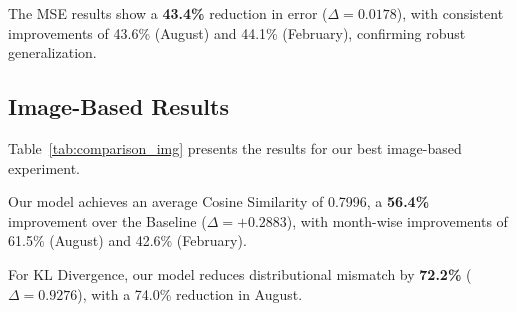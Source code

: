 The MSE results show a \textbf{43.4\%} reduction in error ($\Delta = 0.0178$), with consistent improvements of 43.6\% (August) and 44.1\% (February), confirming robust generalization.


\subsection{Image-Based Results}
\label{sec:image-results}

Table~\ref{tab:comparison_img} presents the results for our best image-based experiment.
\newline

\begin{table}[ht]
    \centering
    \caption{Performance comparison between Baseline and Our Model for image-based experiments. The Baseline model is CLIP ViT-L/14, applied without fine-tuning. Higher values are better for $\uparrow$, and lower values are better for $\downarrow$. Bold values indicate averaged scores.}
    \label{tab:comparison_img}
\end{table}

Our model achieves an average Cosine Similarity of 0.7996, a \textbf{56.4\%} improvement over the Baseline ($\Delta = +0.2883$), with month-wise improvements of 61.5\% (August) and 42.6\% (February).
\newline

For KL Divergence, our model reduces distributional mismatch by \textbf{72.2\%} ($\Delta = 0.9276$), with a 74.0\% reduction in August.
\newline

